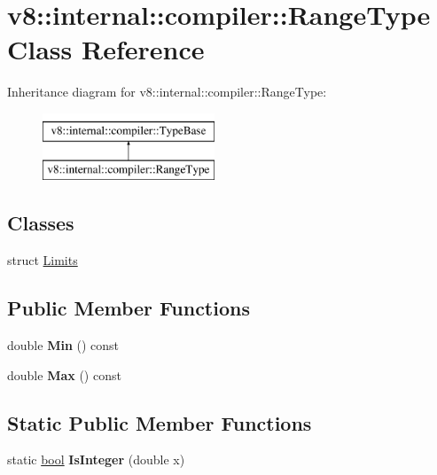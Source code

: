 \hypertarget{classv8_1_1internal_1_1compiler_1_1RangeType}{}\section{v8\+:\+:internal\+:\+:compiler\+:\+:Range\+Type Class Reference}
\label{classv8_1_1internal_1_1compiler_1_1RangeType}
Inheritance diagram for v8\+:\+:internal\+:\+:compiler\+:\+:Range\+Type\+:\begin{figure}[H]
\begin{center}
\leavevmode
\includegraphics[height=2.000000cm]{classv8_1_1internal_1_1compiler_1_1RangeType}
\end{center}
\end{figure}
\subsection*{Classes}
\begin{DoxyCompactItemize}
\item 
struct \mbox{\hyperlink{structv8_1_1internal_1_1compiler_1_1RangeType_1_1Limits}{Limits}}
\end{DoxyCompactItemize}
\subsection*{Public Member Functions}
\begin{DoxyCompactItemize}
\item 
\mbox{\label{classv8_1_1internal_1_1compiler_1_1RangeType_a2d4e699e84e36f99d227d6cb054c0762}} 
double {\bfseries Min} () const
\item 
\mbox{\label{classv8_1_1internal_1_1compiler_1_1RangeType_abbdca79f3cd28964b63acb1d9da4c9ae}} 
double {\bfseries Max} () const
\end{DoxyCompactItemize}
\subsection*{Static Public Member Functions}
\begin{DoxyCompactItemize}
\item 
\mbox{\label{classv8_1_1internal_1_1compiler_1_1RangeType_a0a0759936eb85a8f741cc31b5bc6b60d}} 
static \mbox{\hyperlink{classbool}{bool}} {\bfseries Is\+Integer} (double x)
\end{DoxyCompactItemize}
